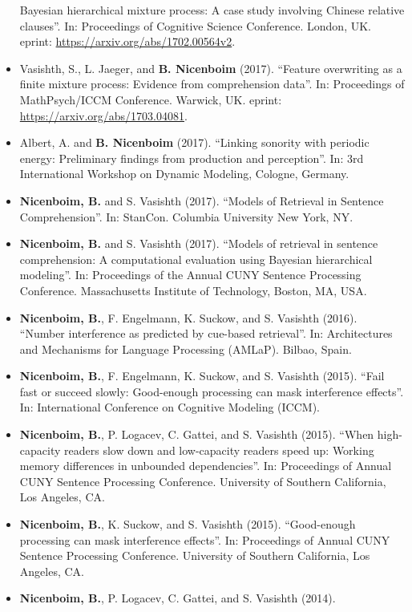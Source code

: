 \documentclass[]{article}
\begin{document}
\begin{itemize}
  Bayesian hierarchical mixture process: A case study involving Chinese
  relative clauses''. In: Proceedings of Cognitive Science Conference.
  London, UK. eprint: \url{https://arxiv.org/abs/1702.00564v2}.
\item
  Vasishth, S., L. Jaeger, and \textbf{B. Nicenboim} (2017). ``Feature
  overwriting as a finite mixture process: Evidence from comprehension
  data''. In: Proceedings of MathPsych/ICCM Conference. Warwick, UK.
  eprint: \url{https://arxiv.org/abs/1703.04081}.
\item
  Albert, A. and \textbf{B. Nicenboim} (2017). ``Linking sonority with
  periodic energy: Preliminary findings from production and
  perception''. In: 3rd International Workshop on Dynamic Modeling,
  Cologne, Germany.
\item
  \textbf{Nicenboim, B.} and S. Vasishth (2017). ``Models of Retrieval
  in Sentence Comprehension''. In: StanCon. Columbia University New
  York, NY.
\item
  \textbf{Nicenboim, B.} and S. Vasishth (2017). ``Models of retrieval
  in sentence comprehension: A computational evaluation using Bayesian
  hierarchical modeling''. In: Proceedings of the Annual CUNY Sentence
  Processing Conference. Massachusetts Institute of Technology, Boston,
  MA, USA.
\item
  \textbf{Nicenboim, B.}, F. Engelmann, K. Suckow, and S. Vasishth
  (2016). ``Number interference as predicted by cue-based retrieval''.
  In: Architectures and Mechanisms for Language Processing (AMLaP).
  Bilbao, Spain.
\item
  \textbf{Nicenboim, B.}, F. Engelmann, K. Suckow, and S. Vasishth
  (2015). ``Fail fast or succeed slowly: Good-enough processing can mask
  interference effects''. In: International Conference on Cognitive
  Modeling (ICCM).
\item
  \textbf{Nicenboim, B.}, P. Logacev, C. Gattei, and S. Vasishth (2015).
  ``When high-capacity readers slow down and low-capacity readers speed
  up: Working memory differences in unbounded dependencies''. In:
  Proceedings of Annual CUNY Sentence Processing Conference. University
  of Southern California, Los Angeles, CA.
\item
  \textbf{Nicenboim, B.}, K. Suckow, and S. Vasishth (2015).
  ``Good-enough processing can mask interference effects''. In:
  Proceedings of Annual CUNY Sentence Processing Conference. University
  of Southern California, Los Angeles, CA.
\item
  \textbf{Nicenboim, B.}, P. Logacev, C. Gattei, and S. Vasishth (2014).

\end{itemize}
\end{document}
